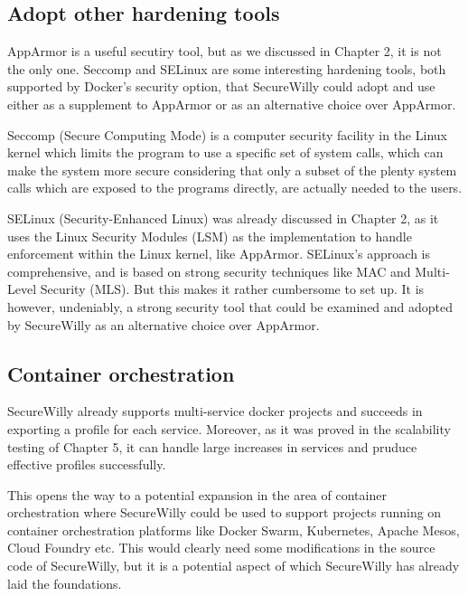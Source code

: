 \subsection{Adopt other hardening tools}
AppArmor is a useful secutiry tool, but as we discussed in Chapter 2, it is not the only one. Seccomp and SELinux are some interesting hardening tools, both supported by Docker's security option, that SecureWilly could adopt and use either as a supplement to AppArmor or as an alternative choice over AppArmor. 

Seccomp (Secure Computing Mode) is a computer security facility in the Linux kernel which limits the program to use a specific set of system calls, which can make the system more secure considering that only a subset of the plenty system calls which are exposed to the programs directly, are actually needed to the users.

SELinux (Security-Enhanced Linux) was already discussed in Chapter 2, as it uses the Linux Security Modules (LSM) as the implementation to handle enforcement within the Linux kernel, like AppArmor. SELinux's approach is comprehensive, and is based on strong security techniques like MAC and Multi-Level Security (MLS). But this makes it rather cumbersome to set up. \cite{appsel} It is however, undeniably, a strong security tool that could be examined and adopted by SecureWilly as an alternative choice over AppArmor.

\subsection{Container orchestration}
SecureWilly already supports multi-service docker projects and succeeds in exporting a profile for each service. Moreover, as it was proved in the scalability testing of Chapter 5, it can handle large increases in services and pruduce effective profiles successfully.

This opens the way to a potential expansion in the area of container orchestration where SecureWilly could be used to support projects running on container orchestration platforms like Docker Swarm, Kubernetes, Apache Mesos, Cloud Foundry etc. This would clearly need some modifications in the source code of SecureWilly, but it is a potential aspect of which SecureWilly has already laid the foundations.
